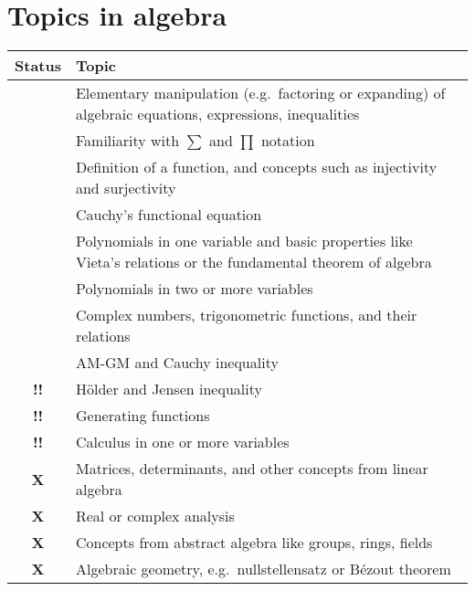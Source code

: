 \documentclass[11pt]{scrartcl}
\providecommand{\isRq}{{\color{green!60!black}\CheckmarkBold}}
\providecommand{\isAv}{{\color{gray}\sffamily\bfseries !!}}
\providecommand{\isEx}{{\color{red}\sffamily\bfseries X}}
\begin{document}
\section{Topics in algebra}
\begin{center}
  \begin{tabular}{cp{12cm}}
  \toprule Status & Topic \\ \midrule
  \isRq & Elementary manipulation (e.g.\ factoring or expanding)
    of algebraic equations, expressions, inequalities \\
  \isRq & Familiarity with $\sum$ and $\prod$ notation \\
  \isRq & Definition of a function, and concepts such as injectivity and surjectivity \\
  \isRq & Cauchy's functional equation \\
  \isRq & Polynomials in one variable and basic properties
    like Vieta's relations or the fundamental theorem of algebra \\
  \isRq & Polynomials in two or more variables \\
  \isRq & Complex numbers, trigonometric functions, and their relations \\
  \isRq & AM-GM and Cauchy inequality \\
  \isAv & H\"{o}lder and Jensen inequality \\
  \isAv & Generating functions \\
  \isAv & Calculus in one or more variables \\
  \isEx & Matrices, determinants, and other concepts from linear algebra \\
  \isEx & Real or complex analysis \\
  \isEx & Concepts from abstract algebra like groups, rings, fields \\
  \isEx & Algebraic geometry, e.g.\ nullstellensatz or B\'{e}zout theorem \\
  \bottomrule
  \end{tabular}
\end{center}
\end{document}
